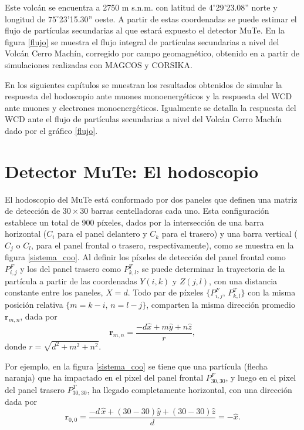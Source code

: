\documentclass[12pt,oneside,openany,letter]{book}
\begin{document}
Este volcán se encuentra a 2750 m s.n.m. con latitud de $4^{\circ}$29'23.08'' norte y longitud de $75^{\circ}$23'15.30'' oeste. A partir de estas coordenadas se puede estimar el flujo de partículas secundarias al que estará expuesto el detector MuTe. En la figura \ref{flujo} se muestra el flujo integral de partículas secundarias a nivel del Volcán Cerro Machín, corregido por campo geomagnético, obtenido en \cite{MuTeSites} a partir de simulaciones realizadas con MAGCOS y CORSIKA.

En los siguientes capítulos se muestran los resultados obtenidos de simular la respuesta del hodoscopio ante muones monoenergéticos y la respuesta del WCD ante muones y electrones monoenergéticos. Igualmente se detalla la respuesta del WCD ante el flujo de partículas secundarias a nivel del Volcán Cerro Machín dado por el gr\'afico \ref{flujo}. 


\chapter{Detector MuTe: El hodoscopio } \label{cap3}
El hodoscopio del MuTe está conformado por dos paneles que definen una matriz de detección de $30\times 30$ barras centelladoras cada uno. Esta configuración establece un total de 900 píxeles, dados por la intersección de una barra horizontal ($C_i$ para el panel delantero y $C_k$ para el trasero) y una barra vertical ($C_j$ o $C_l$, para el panel frontal o trasero, respectivamente), como se muestra en la figura \ref{sistema_coo}. Al definir los píxeles de detección del panel frontal como $P^{F}_{i,j}$ y los del panel trasero como $P^{T}_{k,l}$, se puede determinar la trayectoria de la partícula a partir de las coordenadas $Y(i,k)$ y $Z(j,l)$, con una distancia constante entre los paneles, $X = d$. Todo par de píxeles $\{P^{F}_{i,j},\, P^{T}_{k,l}\}$ con la misma posición relativa $\{m=k-i,\, n=l-j\}$, comparten la misma dirección promedio $\mathbf{r}_{m,n}$, dada por
\begin{equation}
\mathbf{r}_{m,n} = \frac{-d \hat{x} +m\hat{y} +n \hat{z}}{r},
\end{equation}
donde $r=\sqrt{d^2+m^2+n^2}$. 

Por ejemplo, en la figura \ref{sistema_coo} se tiene que una part\'icula (flecha naranja) que ha impactado en el pixel del panel frontal $P^{F}_{30,30}$, y luego en el pixel del panel trasero $P^{T}_{30,30}$, ha llegado completamente horizontal, con una direcci\'on dada por 
\begin{equation}
\mathbf{r}_{0,0} =\frac{-d\, \hat{x} +(30-30)\hat{y} +(30-30) \hat{z}}{d}=-\hat{x}.
\end{equation}
\end{document}
